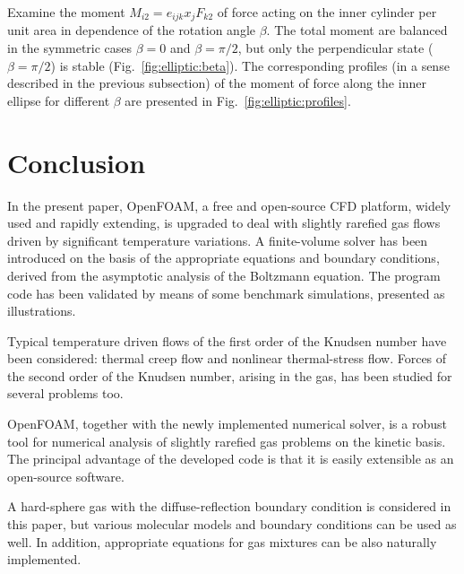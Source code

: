 \documentclass[smallextended]{svjour3} %
\begin{document}
Examine the moment \(M_{i2} = e_{ijk}x_jF_{k2}\) of force acting on the inner cylinder
per unit area in dependence of the rotation angle \(\beta\).
The total moment are balanced in the symmetric cases \(\beta=0\) and \(\beta=\pi/2\),
but only the perpendicular state (\(\beta=\pi/2\)) is stable (Fig.~\ref{fig:elliptic:beta}).
The corresponding profiles (in a sense described in the previous subsection)
of the moment of force along the inner ellipse for different \(\beta\)
are presented in Fig.~\ref{fig:elliptic:profiles}.

\section{Conclusion}

In the present paper, OpenFOAM\textregistered{}, a free and open-source CFD platform,
widely used and rapidly extending, is upgraded to deal with
slightly rarefied gas flows driven by significant temperature variations.
A finite-volume solver has been introduced on the basis of the appropriate
equations and boundary conditions, derived from the asymptotic analysis of the Boltzmann equation.
The program code has been validated by means of some benchmark simulations,
presented as illustrations.

Typical temperature driven flows of the first order of the Knudsen number have been considered:
thermal creep flow and nonlinear thermal-stress flow.
Forces of the second order of the Knudsen number, arising in the gas,
has been studied for several problems too.

OpenFOAM\textregistered{}, together with the newly implemented numerical solver,
is a robust tool for numerical analysis of slightly rarefied gas problems
on the kinetic basis. The principal advantage of the developed code is that
it is easily extensible as an open-source software.

A hard-sphere gas with the diffuse-reflection boundary condition is considered in this paper,
but various molecular models and boundary conditions can be used as well.
In addition, appropriate equations for gas mixtures can be also naturally implemented.


\end{document}
